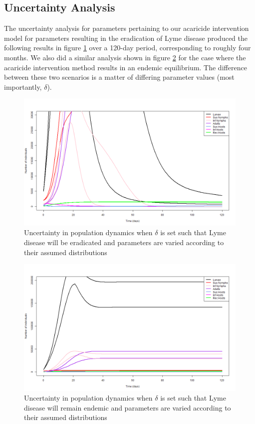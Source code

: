 \documentclass[12pt, centerh1]{article}
\begin{document}
\subsection{Uncertainty Analysis}
The uncertainty analysis for parameters pertaining to our acaricide intervention model for parameters resulting in the eradication of Lyme disease produced the following results in figure \ref{fig:un_eradicated} over a 120-day period, corresponding to roughly four months. We also did a similar analysis shown in figure \ref{fig:un_endemic} for the case where the acaricide intervention method results in an endemic equilibrium. The difference between these two scenarios is a matter of differing parameter values (most importantly, $\delta$).

\begin{figure}[h]
    \centering
    \includegraphics[scale = 0.4]{figures/uncertainty_eradicated.png}
    \caption{Uncertainty in population dynamics when $\delta$ is set such that Lyme disease will be eradicated and parameters are varied according to their assumed distributions}
    \label{fig:un_eradicated}
\end{figure}

\begin{figure}[h]
    \centering
    \includegraphics[scale = 0.4]{figures/uncertainty_endemic.png}
    \caption{Uncertainty in population dynamics when $\delta$ is set such that Lyme disease will remain endemic and parameters are varied according to their assumed distributions}
    \label{fig:un_endemic}
\end{figure}
\end{document}
